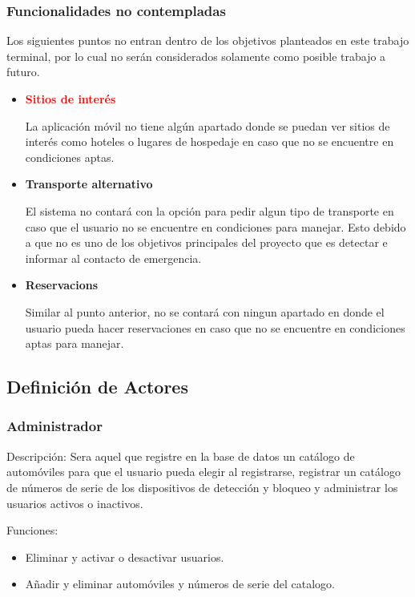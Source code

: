 	\subsubsection{Funcionalidades no contempladas}
	Los siguientes puntos no entran dentro de los objetivos planteados en este trabajo terminal, por lo cual no serán considerados solamente como posible trabajo a futuro.
		\begin{itemize}
			\item {\textbf{\textcolor{red}{Sitios de interés}} \par La aplicación móvil no tiene algún apartado donde se puedan ver sitios de interés como hoteles o lugares de hospedaje en caso que no se encuentre en condiciones aptas.}
			\item {\textbf{Transporte alternativo} \par El sistema no contará con la opción para pedir algun tipo de transporte en caso que el usuario no se encuentre en condiciones para manejar. Esto debido a que no es uno de los objetivos principales del proyecto que es detectar e informar al contacto de emergencia.}
			\item {\textbf{Reservacions} \par Similar al punto anterior, no se contará con ningun apartado en donde el usuario pueda hacer reservaciones en caso que no se encuentre en condiciones aptas para manejar.}
		\end{itemize}
\subsection{Definición de Actores}
	\subsubsection{Administrador}
	Descripción: Sera aquel que registre en la base de datos un catálogo de automóviles para que el usuario pueda elegir al registrarse, registrar un catálogo de números de serie de los dispositivos de detección y bloqueo y administrar los usuarios activos o inactivos. \par
	Funciones:
	\begin{itemize}
		\item Eliminar y activar o desactivar usuarios.
		\item Añadir y eliminar automóviles y números de serie del catalogo.
	\end{itemize}
